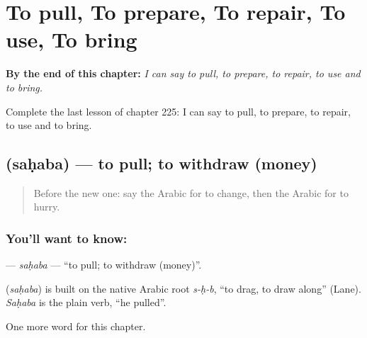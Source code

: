 
\chapter{To pull, To prepare, To repair, To use, To bring}
\label{ch:ar-to-pull-to-prepare-to-repair-to-use-to-bring}

\begin{chapteropening}
\textbf{By the end of this chapter:} \emph{I can say to pull, to prepare, to repair, to use and to bring.}

Complete the last lesson of chapter 225: I can say to pull, to prepare, to repair, to use and to bring.
\end{chapteropening}

\section[\texorpdfstring{\ar{سحب} (saḥaba)}{سحب (saḥaba)}]{ (saḥaba) — to pull; to withdraw (money)}

\label{lesson:AR-C225-sahaba}



\begin{quote}
Before the new one: say the Arabic for to change, then the Arabic for to hurry.
\end{quote}

\subsection*{You'll want to know: }
\textbf{} — \emph{saḥaba} — \textquotedblleft{}to pull; to withdraw (money)\textquotedblright{}.

\begin{cousinweb}
\textbf{} (\emph{saḥaba}) is built on the native Arabic root \emph{s-ḥ-b}, \textquotedblleft{}to drag, to draw along\textquotedblright{} (Lane). \emph{Saḥaba} is the plain verb, \textquotedblleft{}he pulled\textquotedblright{}.
\end{cousinweb}

\begin{grammarlens}[title={What you've built}]
One more word for this chapter.
\end{grammarlens}

